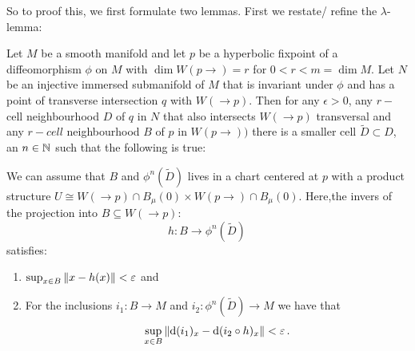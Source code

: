So to proof this, we first formulate two lemmas. First we restate/ refine the $\lambda$-lemma: 
\begin{lemma} 
	Let $ M$ be a smooth manifold and let $p$ be a hyperbolic fixpoint of a diffeomorphism $\phi$ on $M$ with $\dim W(p \to)=r$ for ${0<r<m=\dim M}$. Let $N$ be an injective immersed submanifold of $M$ that is invariant under $\phi$ and has a point of transverse intersection $q$ with $W(\to p)$. Then for any $\epsilon>0$, any $r-$cell neighbourhood $D$ of $q$ in $N$ that also intersects $W(\to p)$ transversal and any $r-cell$ neighbourhood $B$ of $p$ in $W(p\to))$ there is a smaller cell $\tilde{D}\subset D$, an $n\in \mathbb{N}$ such that the following is true:
	
	We can assume that $B$ and $\phi^n(\tilde{D})$ lives in a chart centered at $p$ with a product structure $U\cong W(\to p)\cap B_\mu(0)\times W(p\to)\cap B_\mu(0)$. Here,the invers of the projection into $B\subseteq W(\to p)$:
	\begin{equation*}
		h: B\to \phi^n(\tilde{D})\, 
	\end{equation*}satisfies:
	\begin{enumerate}
		\item $\sup_{x \in B}\left\lVert x-h(x)\right\rVert<\varepsilon$ and
		\item For the inclusions  $i_1:B\to M$ and $i_2:\phi^n(\tilde{D})\to M$ we have that 
		\begin{equation*}
			\sup_{x \in B}\left\lVert\mathop{}\!\mathrm{d}(i_1)_x-\mathop{}\!\mathrm{d}(i_2\circ h)_x\right\rVert<\varepsilon\, .
		\end{equation*}
	\end{enumerate}
\end{lemma}
